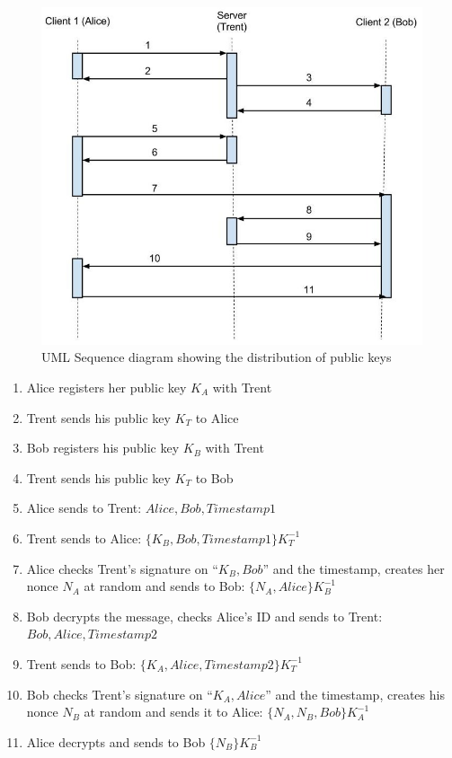 \documentclass[a4paper,10pt]{report}
\begin{document}
\begin{figure}[htb]
\centering
\includegraphics[scale=0.4]{images/keyex.jpg}
\caption{UML Sequence diagram showing the distribution of public keys}
\label{fig:keyex}
\end{figure}
 
\begin{enumerate}
  \item Alice registers her public key $ K_{A} $ with Trent
  \item Trent sends his public key $ K_{T} $ to Alice
  \item Bob registers his public key $ K_{B} $ with Trent
  \item Trent sends his public key $ K_{T} $ to Bob
  \item Alice sends to Trent: $ Alice, Bob, Timestamp1 $
  \item Trent sends to Alice: $ \{K_{B},Bob, Timestamp1\} K_{T}^{-1} $
  \item Alice checks Trent’s signature on “$ {K_{B},Bob} $” and the timestamp, creates her nonce $ N_{A} $ at random and sends to Bob: $ \{N_{A} , Alice \}K_{B}^{-1} $
  \item Bob decrypts the message, checks Alice’s ID and sends to Trent: $ Bob, Alice, Timestamp2 $
  \item Trent sends to Bob: $ \{K_{A} , Alice, Timestamp2\}K_{T}^{-1} $
  \item Bob checks Trent’s signature on “$ K_{A}, Alice $” and the timestamp, creates his nonce $ N_{B} $ at random and sends it to Alice: $ \{N_{A}, N_{B}, Bob\}K_{A}^{-1} $
  \item Alice decrypts and sends to Bob $ \{N_{B}\}K_{B}^{-1} $
\end{enumerate}
\end{document}
